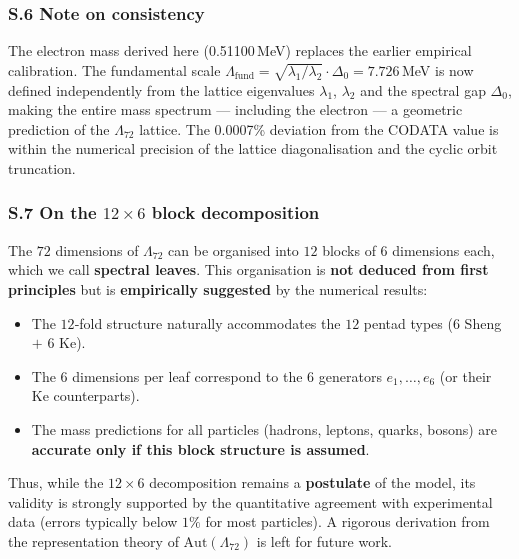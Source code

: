 \documentclass[11pt]{article}
\providecommand{\tightlist}{\setlength{\itemsep}{2pt}\setlength{\parskip}{6pt}}
\providecommand{\tightlist}{%
  \setlength{\itemsep}{2pt}\setlength{\parskip}{6pt}
}
\begin{document}
\hypertarget{s.6-note-on-consistency}{%
\subsubsection{S.6 Note on consistency}\label{s.6-note-on-consistency}}

The electron mass derived here (0.51100\,MeV) replaces the earlier
empirical calibration. The fundamental scale
\(\Lambda_{\text{fund}} = \sqrt{\lambda_1/\lambda_2} \cdot \Delta_0 = 7.726\)\,MeV
is now defined independently from the lattice eigenvalues \(\lambda_1\),
\(\lambda_2\) and the spectral gap \(\Delta_0\), making the entire mass
spectrum --- including the electron --- a geometric prediction of the
\(\Lambda_{72}\) lattice. The 0.0007\% deviation from the CODATA value
is within the numerical precision of the lattice diagonalisation and the
cyclic orbit truncation.

\hypertarget{s.7-on-the-12-times-6-block-decomposition}{%
\subsubsection{\texorpdfstring{S.7 On the \(12 \times 6\) block
decomposition}{S.7 On the 12 \textbackslash times 6 block decomposition}}\label{s.7-on-the-12-times-6-block-decomposition}}

The \(72\) dimensions of \(\Lambda_{72}\) can be organised into \(12\)
blocks of \(6\) dimensions each, which we call \textbf{spectral leaves}.
This organisation is \textbf{not deduced from first principles} but is
\textbf{empirically suggested} by the numerical results:

\begin{itemize}
\tightlist
\item
  The \(12\)‑fold structure naturally accommodates the \(12\) pentad
  types (\(6\) Sheng \(+\) \(6\) Ke).
\item
  The \(6\) dimensions per leaf correspond to the \(6\) generators
  \(e_1,\dots,e_6\) (or their Ke counterparts).
\item
  The mass predictions for all particles (hadrons, leptons, quarks,
  bosons) are \textbf{accurate only if this block structure is assumed}.
\end{itemize}

Thus, while the \(12 \times 6\) decomposition remains a
\textbf{postulate} of the model, its validity is strongly supported by
the quantitative agreement with experimental data (errors typically
below \(1\%\) for most particles). A rigorous derivation from the
representation theory of \(\mathrm{Aut}(\Lambda_{72})\) is left for
future work.
\end{document}
